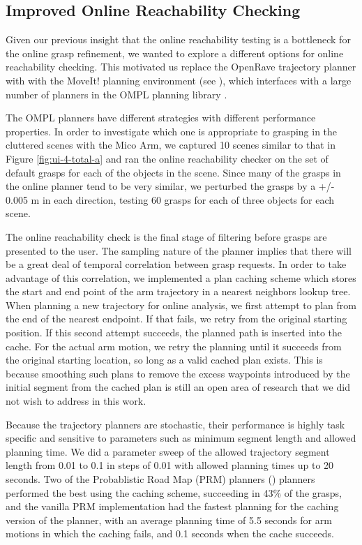 
\subsection{Improved Online Reachability Checking}
Given our previous insight that the online reachability testing is a bottleneck for the online grasp refinement, we wanted to explore a different options for online reachability checking. This motivated us replace the OpenRave trajectory planner with with the MoveIt! planning environment (see \cite{moveit}), which interfaces with a large number of planners in the OMPL planning library \cite{ompl}.

The OMPL planners have different strategies with different performance properties. In order to investigate which one is appropriate to grasping in the cluttered scenes with the Mico Arm, we captured 10 scenes similar to that in Figure \ref{fig:ui-4-total-a} and ran the online reachability checker on the set of default grasps for each of the objects in the scene. Since many of the grasps in the online planner tend to be very similar, we perturbed the grasps by a +/- 0.005 m in each direction, testing 60 grasps for each of three objects for each scene. 

The online reachability check is the final stage of filtering before grasps are presented to the user. The sampling nature of the planner implies that there will be a great deal of temporal correlation between grasp requests. In order to take advantage of this correlation, we implemented a plan caching scheme which stores the start and end point of the arm trajectory in a nearest neighbors lookup tree. When planning a new trajectory for online analysis, we first attempt to plan from the end of the nearest endpoint. If that fails, we retry from the original starting position. If this second attempt succeeds, the planned path is inserted into the cache. For the actual arm motion, we retry the planning until it succeeds from the original starting location, so long as a valid cached plan exists. This is because smoothing such plans to remove the excess waypoints introduced by the initial segment from the cached plan is still an open area of research that we did not wish to address in this work.  

Because the trajectory planners are stochastic, their performance is highly task specific and sensitive to parameters such as minimum segment length and allowed planning time. We did a parameter sweep of the allowed trajectory segment length from 0.01 to 0.1 in steps of 0.01 with allowed planning times up to 20 seconds. Two of the Probablistic Road Map (PRM) planners (\cite{PRM}) planners performed the best using the caching scheme, succeeding in 43\% of the grasps, and the vanilla PRM implementation had the fastest planning for the caching version of the planner, with an average planning time of 5.5 seconds for arm motions in which the caching fails, and 0.1 seconds when the cache succeeds. 

